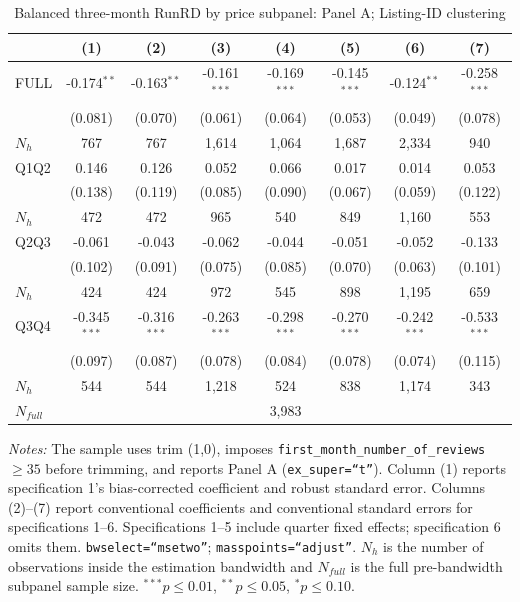 \begin{table}[!htbp]
\centering
\caption{Balanced three-month RunRD by price subpanel: Panel A; Listing-ID clustering}
\scriptsize
\setlength{\tabcolsep}{5pt}
\begin{tabular}{l*{7}{c}}
\toprule
 & (1) & (2) & (3) & (4) & (5) & (6) & (7) \\
\midrule
FULL & -0.174$^{**}$ & -0.163$^{**}$ & -0.161$^{***}$ & -0.169$^{***}$ & -0.145$^{***}$ & -0.124$^{**}$ & -0.258$^{***}$ \\
 & (0.081) & (0.070) & (0.061) & (0.064) & (0.053) & (0.049) & (0.078) \\
$N_h$ & 767 & 767 & 1,614 & 1,064 & 1,687 & 2,334 & 940 \\
\addlinespace
Q1Q2 & 0.146 & 0.126 & 0.052 & 0.066 & 0.017 & 0.014 & 0.053 \\
 & (0.138) & (0.119) & (0.085) & (0.090) & (0.067) & (0.059) & (0.122) \\
$N_h$ & 472 & 472 & 965 & 540 & 849 & 1,160 & 553 \\
\addlinespace
Q2Q3 & -0.061 & -0.043 & -0.062 & -0.044 & -0.051 & -0.052 & -0.133 \\
 & (0.102) & (0.091) & (0.075) & (0.085) & (0.070) & (0.063) & (0.101) \\
$N_h$ & 424 & 424 & 972 & 545 & 898 & 1,195 & 659 \\
\addlinespace
Q3Q4 & -0.345$^{***}$ & -0.316$^{***}$ & -0.263$^{***}$ & -0.298$^{***}$ & -0.270$^{***}$ & -0.242$^{***}$ & -0.533$^{***}$ \\
 & (0.097) & (0.087) & (0.078) & (0.084) & (0.078) & (0.074) & (0.115) \\
$N_h$ & 544 & 544 & 1,218 & 524 & 838 & 1,174 & 343 \\

\midrule
$N_{full}$ & \multicolumn{7}{c}{3,983} \\
\bottomrule
\end{tabular}
\begin{minipage}{0.98\textwidth}
\footnotesize
\textit{Notes:} The sample uses trim (1,0), imposes \texttt{first\_month\_number\_of\_reviews}$\geq35$ before trimming, and reports Panel A (\texttt{ex\_super=``t''}). Column (1) reports specification 1's bias-corrected coefficient and robust standard error. Columns (2)--(7) report conventional coefficients and conventional standard errors for specifications 1--6. Specifications 1--5 include quarter fixed effects; specification 6 omits them. \texttt{bwselect=``msetwo''}; \texttt{masspoints=``adjust''}. $N_h$ is the number of observations inside the estimation bandwidth and $N_{full}$ is the full pre-bandwidth subpanel sample size. $^{***}p\leq0.01$, $^{**}p\leq0.05$, $^{*}p\leq0.10$.
\end{minipage}
\end{table}
\clearpage

